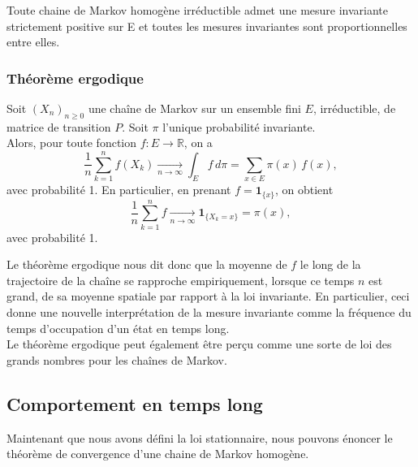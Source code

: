 \documentclass{article}
\begin{document}
\begin{tcolorbox}[colback=white,colframe=blue!80!black,title=Mesures invariantes d'une chaîne de Markov irréductible]
Toute chaine de Markov homogène irréductible admet une mesure invariante strictement positive sur E et toutes les mesures invariantes sont proportionnelles entre elles.
\end{tcolorbox}

\subsubsection{Théorème ergodique}

\begin{tcolorbox}[colback=white,colframe=red!80!black,title=Théorème ergodique (admis)]
Soit $(X_n)_{n \ge 0}$ une chaîne de Markov sur un ensemble fini $E$, irréductible, de matrice de transition $P$. Soit $\pi$ l'unique probabilité invariante. \\

Alors, pour toute fonction $f : E \to \mathbb{R}$, on a
\[
\frac{1}{n} \sum_{k=1}^{n} f(X_k) \xrightarrow[n \to \infty]{} \int_E f \, d\pi = \sum_{x \in E} \pi(x)\, f(x),
\]
avec probabilité 1. En particulier, en prenant $f = \mathbf{1}_{\{x\}}$, on obtient
\[
\frac{1}{n} \sum_{k=1}^{n} f \xrightarrow[n \to \infty]{} \mathbf{1}_{\{X_{k} = x\}} = \pi(x),
\]
avec probabilité 1.
\end{tcolorbox}

Le théorème ergodique nous dit donc que la moyenne de $f$ le long de la trajectoire de la chaîne se rapproche empiriquement, lorsque ce temps $n$ est grand, de sa moyenne spatiale par rapport à la loi invariante. En particulier, ceci donne une nouvelle interprétation de la mesure invariante comme la fréquence du temps d’occupation d’un état en temps long. \\

Le théorème ergodique peut également être perçu comme une sorte de loi des grands nombres pour les chaînes de Markov.

\newpage
\subsection{Comportement en temps long}

Maintenant que nous avons défini la loi stationnaire, nous pouvons énoncer le théorème de convergence d'une chaine de Markov homogène. \\ %
\end{document}
